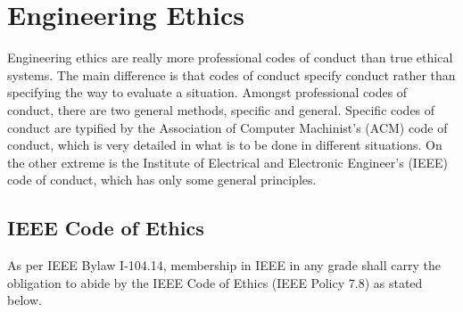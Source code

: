 \chapter{Engineering Ethics}\label{ch-eng-ethics}

Engineering ethics are really more professional codes of conduct than true ethical systems.  The main difference is that codes of conduct specify conduct rather than specifying the way to evaluate a situation.  Amongst professional codes of conduct, there are two general methods, specific and general.  Specific codes of conduct are typified by the Association of Computer Machinist's (ACM) code of conduct, which is very detailed in what is to be done in different situations.  On the other extreme is the Institute of Electrical and Electronic Engineer's (IEEE) code of conduct, which has only some general principles.

\section{IEEE Code of Ethics}

As per IEEE Bylaw I-104.14, membership in IEEE in any grade shall carry the obligation to abide by the IEEE Code of Ethics (IEEE Policy 7.8) as stated below.



